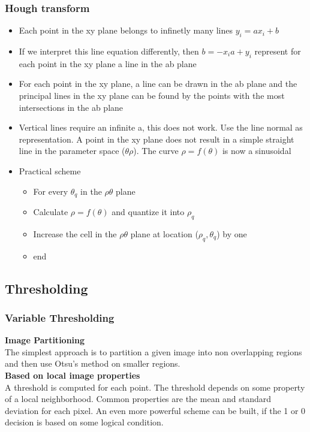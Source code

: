 \subsubsection{Hough transform}
\begin{itemize}
\item Each point in the xy plane belongs to infinetly many lines $y_i=ax_i+b$
\item If we interpret this line equation differently, then $b=-x_ia+y_i$ represent for each point in the xy plane a line in the ab plane
\item For each point in the xy plane, a line can be drawn in the ab plane and the principal lines in the xy plane can be found by the points with the most intersections in the ab plane
\item Vertical lines require an infinite a, this does not work. Use the line normal as representation. A point in the xy plane does not result in a simple straight line in the parameter space ($\theta\rho$). The curve $\rho = f(\theta)$ is now a sinusoidal
\item Practical scheme
\begin{itemize}
\item For every $\theta_q$ in the $\rho\theta$ plane
\item Calculate $\rho = f(\theta)$ and quantize it into $\rho_q$
\item Increase the cell in the $\rho\theta$ plane at location ($\rho_q, \theta_q$) by one
\item end
\end{itemize}
\end{itemize}

\subsection{Thresholding}
\subsubsection{Variable Thresholding}
\textbf{Image Partitioning}\\
The simplest approach is to partition a given image into non overlapping regions and then use Otsu's method on smaller regions.\\
\textbf{Based on local image properties}\\
A threshold is computed for each point. The threshold depends on some property of a local neighborhood. Common properties are the mean and standard deviation for each pixel.
An even more powerful scheme can be built, if the 1 or 0 decision is based on some logical condition.\\

